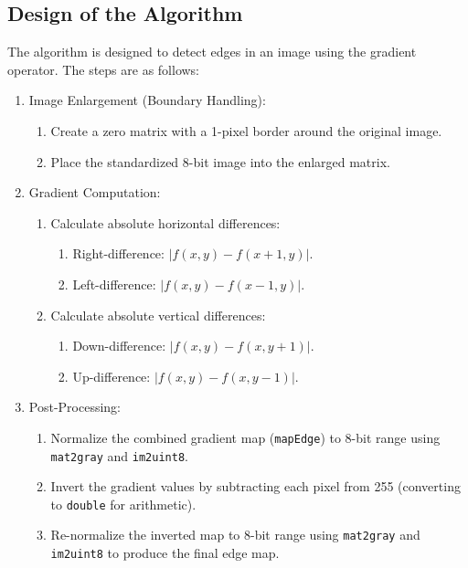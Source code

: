 \documentclass[a4paper,11pt]{article}
\begin{document}
\subsection{Design of the Algorithm}
The algorithm is designed to detect edges in an image using the gradient operator. The steps are as follows:
\begin{enumerate}
    \item Image Enlargement (Boundary Handling):
    \begin{enumerate}
        \item Create a zero matrix with a 1-pixel border around the original image.
        \item Place the standardized 8-bit image into the enlarged matrix.
    \end{enumerate}
\item Gradient Computation:
    \begin{enumerate}
        \item Calculate absolute horizontal differences:
            \begin{enumerate}
                \item Right-difference: $ |f(x,y) - f(x+1,y)| $.
                \item Left-difference: $ |f(x,y) - f(x-1,y)| $.
            \end{enumerate}
        \item Calculate absolute vertical differences:
            \begin{enumerate}
                \item Down-difference: $ |f(x,y) - f(x,y+1)| $.
                \item Up-difference: $ |f(x,y) - f(x,y-1)| $.
            \end{enumerate}
    \end{enumerate}

\item Post-Processing:
    \begin{enumerate}
        \item Normalize the combined gradient map (\texttt{mapEdge}) to 8-bit range using \texttt{mat2gray} and \texttt{im2uint8}.
        \item Invert the gradient values by subtracting each pixel from 255 (converting to \texttt{double} for arithmetic).
        \item Re-normalize the inverted map to 8-bit range using \texttt{mat2gray} and \texttt{im2uint8} to produce the final edge map.
    \end{enumerate}
\end{enumerate}
\end{document}
